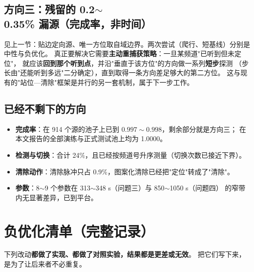 \subsection{方向三：残留的 0.2$\sim$0.35\% 漏源（完成率，非时间）}

见上一节：贴边定向源、唯一方位取自域边界。两次尝试（爬行、短基线）分别是中性与负优化。
真正要解决它需要\textbf{主动重捕获策略}：一旦某频道"已听到但未定位"，
就应该\textbf{回到那个听到点}，并沿"垂直于该方位"的方向做一系列\textbf{短步}探测
（步长由"还能听到多远"二分确定），直到取得一条方向差足够大的第二方位。
这与现有的"站位—清除"框架是并行的另一套机制，属于下一步工作。

\subsection{已经不剩下的方向}

\begin{itemize}[leftmargin=1.8em]
  \item \textbf{完成率}：在 914 个源的池子上已到 $0.997\sim0.998$，剩余部分就是方向三；
        在本文报告的全部演练与正式测试池上均为 1.0000。
  \item \textbf{检测与切换}：合计 24\%，且已经按频道号升序测量（切换次数已接近下界）。
  \item \textbf{清除动作}：清除脉冲只占 0.9\%，图案化清除已经把"定位"转成了"清除"。
  \item \textbf{参数}：8$\sim$9 个参数在 313$\sim$348 s（问题三）与 850$\sim$1050 s（问题四）
        的窄带内无显著差异，已到平台。
\end{itemize}

\section{负优化清单（完整记录）}

下列改动\textbf{都做了实现、都做了对照实验，结果都是更差或无效}。
把它们写下来，是为了让后来者不必重复。

